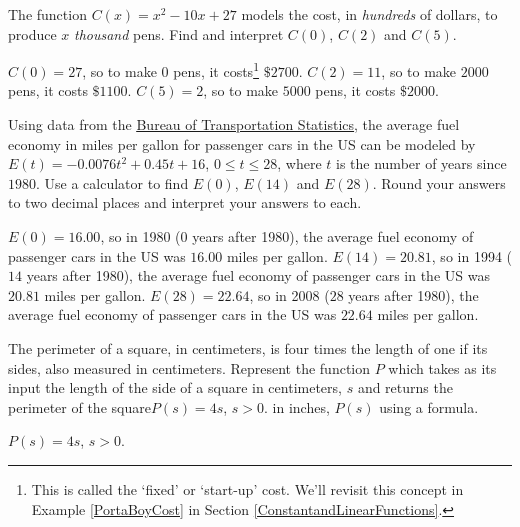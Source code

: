 \documentclass{ximera}
\begin{document}
\begin{problem}
The function $C(x) = x^2-10x+27$  models the cost, in \textit{hundreds} of dollars, to produce $x$ \textit{thousand} pens.  Find and interpret $C(0)$, $C(2)$ and $C(5)$.

\begin{solution}
$C(0) = 27$, so to make $0$ pens, it costs\footnote{This is called the `fixed' or `start-up' cost.  We'll revisit this concept in Example \ref{PortaBoyCost} in Section \ref{ConstantandLinearFunctions}.} $\$ 2700$.  $C(2) = 11$, so to make $2000$ pens, it costs $\$1100$.  $C(5) = 2$, so to make $5000$ pens, it costs $\$2000$.
\end{solution}
\end{problem}

\begin{problem}
Using data from the  \href{http://www.bts.gov/publications/national_transportation_statistics/html/table_04_23.html}{\underline{Bureau of Transportation Statistics}}, the average fuel economy in miles per gallon for passenger cars in the US can be modeled by  $E(t) = -0.0076t^2+0.45t + 16$, $0 \leq t \leq 28$, where $t$ is the number of years since $1980$. Use a calculator to find $E(0)$, $E(14)$ and $E(28)$.  Round your answers to two decimal places and interpret your answers to each.

\begin{solution}
$E(0) = 16.00$, so in 1980 ($0$ years after 1980), the average fuel economy of passenger cars in the US was $16.00$ miles per gallon.  $E(14) = 20.81$, so in 1994 ($14$ years after 1980), the average fuel economy of passenger cars in the US was $20.81$ miles per gallon.  $E(28) = 22.64$, so in 2008 ($28$ years after 1980), the average fuel economy of passenger cars in the US was $22.64$ miles per gallon.
\end{solution}
\end{problem} 

\begin{problem}
The perimeter of a square, in centimeters,  is four times the length of one if its sides, also measured in centimeters.  Represent the function $P$ which takes as its input the length of the side of a square in centimeters, $s$ and returns the perimeter of the square$P(s) = 4s$, $s > 0$. in inches, $P(s)$ using a formula.

\begin{solution}
$P(s) = 4s$, $s > 0$.
\end{solution}
\end{problem}
\end{document}
